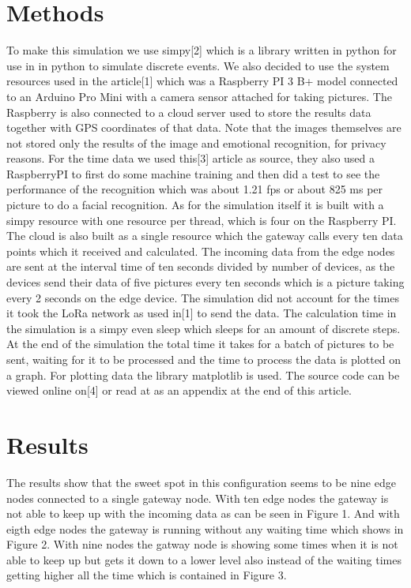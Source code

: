 \documentclass[a4paper,11pt,notitlepage,twocolumn]{article}
\begin{document}
  \section{Methods}
    To make this simulation we use simpy[2] which is a library written in python for use in
    in python to simulate discrete events. We also decided to use the system resources used
    in the article[1] which was a Raspberry PI 3 B+ model connected to an Arduino Pro Mini
    with a camera sensor attached for taking pictures. The Raspberry is also connected to a
    cloud server used to store the results data together with GPS coordinates of that data.
    Note that the images themselves are not stored only the results of the image and
    emotional recognition, for privacy reasons. For the time data we used this[3] article as
    source, they also used a RaspberryPI to first do some machine training and then did a test
    to see the performance of the recognition which was about 1.21 fps or about 825 ms per
    picture to do a facial recognition. As for the simulation itself it is built with a 
    simpy resource with one resource per thread, which is four on the Raspberry PI. The
    cloud is also built as a single resource which the gateway calls every ten data points
    which it received and calculated. The incoming data from the edge nodes are sent at the
    interval time of ten seconds divided by number of devices, as the devices send their data
    of five pictures every ten seconds which is a picture taking every 2 seconds on the edge
    device. The simulation did not account for the times it took the LoRa network as used in[1]
    to send the data. The calculation time in the simulation is a simpy even sleep which sleeps
    for an amount of discrete steps. At the end of the simulation the total time it takes for
    a batch of pictures to be sent, waiting for it to be processed and the time to process
    the data is plotted on a graph. For plotting data the library matplotlib is used. 
    The source code can be viewed online on[4] or read at as an appendix at the end of this article.
  
  \section{Results}
    The results show that the sweet spot in this configuration seems to be nine edge nodes
    connected to a single gateway node. With ten edge nodes the gateway is not able to keep
    up with the incoming data as can be seen in Figure 1. And with eigth edge nodes the gateway is
    running without any waiting time which shows in Figure 2. With nine nodes the gatway node is
    showing some times when it is not able to keep up but gets it down to a lower level also
    instead of the waiting times getting higher all the time which is contained in Figure 3. 
    
\end{document}
